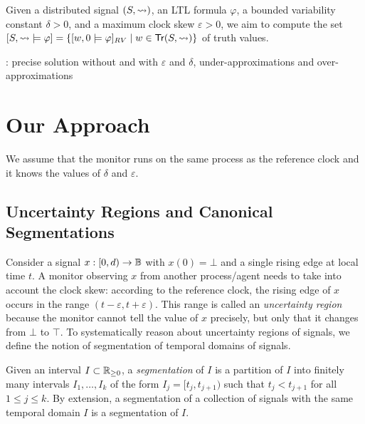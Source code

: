 Given a distributed signal $(S, {\rightsquigarrow})$, an LTL formula $\varphi$, a bounded variability constant $\delta > 0$, and a maximum clock skew $\varepsilon > 0$, we aim to compute the set $[S, {\hb} \models \varphi] = \{ [w, 0 \models \varphi]_{RV} \st w \in \tr(S, {\hb}) \}$ of truth values.

\begin{example}
	\TODO: precise solution without and with $\varepsilon$ and $\delta$, under-approximations and over-approximations
\end{example}

\section{Our Approach}

We assume that the monitor runs on the same process as the reference clock and it knows the values of $\delta$ and $\varepsilon$.

\subsection{Uncertainty Regions and Canonical Segmentations}

Consider a signal $x : [0,d) \to \mathbb{B}$ with $x(0) = \bot$ and a single rising edge at local time $t$.
A monitor observing $x$ from another process/agent needs to take into account the clock skew: according to the reference clock, the rising edge of $x$ occurs in the range $(t - \varepsilon, t + \varepsilon)$.
This range is called an \emph{uncertainty region} because the monitor cannot tell the value of $x$ precisely, but only that it changes from $\bot$ to $\top$.
To systematically reason about uncertainty regions of signals, we define the notion of segmentation of temporal domains of signals.

\begin{definition}
	Given an interval $I \subset \mathbb{R}_{\geq 0}$, a \emph{segmentation} of $I$ is a partition of $I$ into finitely many intervals $I_1, \ldots, I_k$ of the form $I_j = [t_j, t_{j+1})$ such that $t_j < t_{j+1}$ for all $1 \leq j \leq k$.
	By extension, a segmentation of a collection of signals with the same temporal domain $I$ is a segmentation of $I$.
\end{definition}


